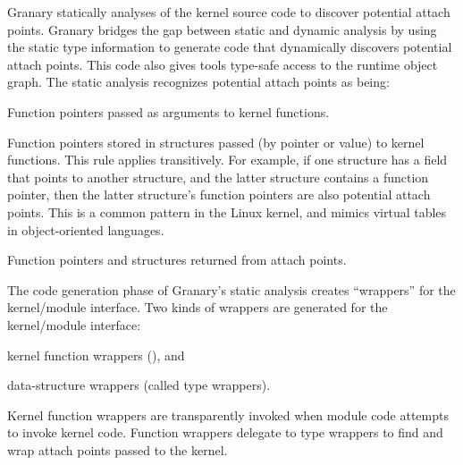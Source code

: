\documentclass[preprint]{sigplanconf}
\newenvironment{enumerate*}%
  {\begin{enumerate}%
    \setlength{\itemsep}{2pt}%
    \setlength{\parskip}{0pt}}%
  {\end{enumerate}}
\begin{document}
Granary statically analyses of the kernel source code to discover potential attach points. Granary bridges the gap between static and dynamic analysis by using the static type information to generate code that dynamically discovers potential attach points. This code also gives tools type-safe access to the runtime object graph. The static analysis recognizes potential attach points as being: \begin{enumerate*}
	\item Function pointers passed as arguments to kernel functions.
	\item Function pointers stored in structures passed (by pointer or value) to kernel functions. This rule applies transitively. For example, if one structure has a field that points to another structure, and the latter structure contains a function pointer, then the latter structure's function pointers are also potential attach points. This is a common pattern in the Linux kernel, and mimics virtual tables in object-oriented languages.
	\item Function pointers and structures returned from attach points.
\end{enumerate*}

The code generation phase of Granary's static analysis creates ``wrappers'' for the kernel/module interface. Two kinds of wrappers are generated for the kernel/module interface: \begin{inparaenum}[i)]
	\item kernel function wrappers (), and
	\item data-structure wrappers (called type wrappers).
\end{inparaenum} Kernel function wrappers are transparently invoked when module code attempts to invoke kernel code. Function wrappers delegate to type wrappers to find and wrap attach points passed to the kernel. 
\end{document}
